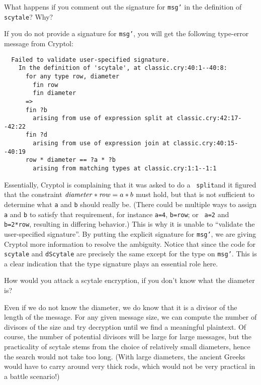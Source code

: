 \begin{Exercise}\label{ex:scytale:0}
  What happens if you comment out the signature for {\tt msg'} in the
  definition of {\tt scytale}? Why?\indScytale
\end{Exercise}
\begin{Answer}
  If you do not provide a signature for {\tt msg'}, you will get the
  following type-error message from Cryptol:
\begin{small}
\begin{Verbatim}
  Failed to validate user-specified signature.
    In the definition of 'scytale', at classic.cry:40:1--40:8:
      for any type row, diameter
        fin row
        fin diameter
      =>
      fin ?b
        arising from use of expression split at classic.cry:42:17--42:22
      fin ?d
        arising from use of expression join at classic.cry:40:15--40:19
      row * diameter == ?a * ?b
        arising from matching types at classic.cry:1:1--1:1
\end{Verbatim}
\end{small}
Essentially, Cryptol is complaining that it was asked to do a {\tt
  split}\indSplit and it figured that the constraint
$\text{\emph{diameter}}*\text{\emph{row}}=a*b$ must hold, but that is
not sufficient to determine what {\tt a} and {\tt b} should really
be. (There could be multiple ways to assign {\tt a} and {\tt b} to
satisfy that requirement, for instance {\tt a=4}, {\tt b=row}; or {\tt
  a=2} and {\tt b=2*row}, resulting in differing behavior.)  This is
why it is unable to ``validate the user-specified signature''.  By
putting the explicit signature for {\tt msg'}, we are giving Cryptol
more information to resolve the ambiguity. Notice that since the code
for {\tt scytale} and {\tt dScytale} are precisely the same except for
the type on {\tt msg'}. This is a clear indication that the type
signature plays an essential role here.\indAmbiguity\indSignature
\end{Answer}

\begin{Exercise}\label{ex:scytale:1}
  How would you attack a scytale encryption, if you don't know what
  the diameter is?
\end{Exercise}
\begin{Answer}
  Even if we do not know the diameter, we do know that it is a divisor
  of the length of the message. For any given message size, we can
  compute the number of divisors of the size and try decryption until
  we find a meaningful plaintext.  Of course, the number of potential
  divisors will be large for large messages, but the practicality of
  scytale stems from the choice of relatively small diameters, hence
  the search would not take too long. (With large diameters, the
  ancient Greeks would have to carry around very thick rods, which
  would not be very practical in a battle scenario!)\indScytale
\end{Answer}

